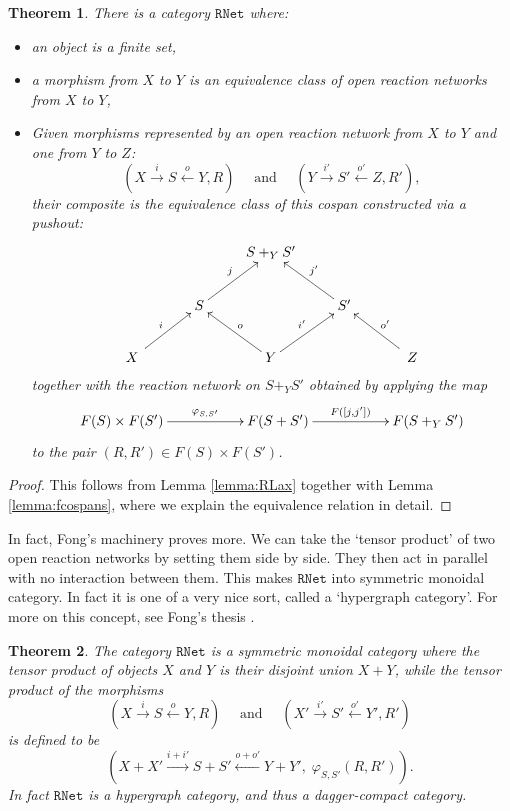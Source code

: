 \documentclass{compositionalityarticle}
\newcommand{\RNet}{\mathtt{RNet}}
\theoremstyle{compositionality}
\newtheorem{thm}{Theorem}
\theoremstyle{remark}
\begin{document}
\begin{thm}
There is a category $\RNet$ where:
\begin{itemize}
\item an object is a finite set,
\item a morphism from $X$ to $Y$ is an equivalence class of open reaction networks 
from $X$ to $Y$, 
\item Given morphisms represented by an open reaction network from $X$ to $Y$ and one from $Y$ to $Z$:
 \[
    (X \stackrel{i}\longrightarrow S \stackrel{o}\longleftarrow Y, R) 
    \quad \textrm{ and } \quad
    (Y \stackrel{i'}\longrightarrow S' \stackrel{o'}\longleftarrow Z, R'), 
  \]
their composite is the equivalence class of this cospan constructed via a pushout:
  \[
    \xymatrix{
      && S +_Y S' \\
      & S \ar[ur]^{j} && S' \ar[ul]_{j'} \\
      \quad X\quad \ar[ur]^{i} && Y \ar[ul]_{o} \ar[ur]^{i'} &&\quad Z \quad \ar[ul]_{o'}
    }
  \]
together with the reaction network on $S +_Y S'$ obtained by applying the map
\[      
\xymatrix{      F(S) \times F(S') \ar[rr]^-{\varphi_{S,S'}} && 
                     F(S + S') \ar[rr]^-{F([j,j'])} && F(S +_Y S') } \]
to the pair $(R,R') \in F(S) \times F(S')$.  
\end{itemize}
\end{thm}

\begin{proof}
This follows from Lemma \ref{lemma:RLax} together with Lemma 
\ref{lemma:fcospans}, where we explain the equivalence relation in detail.  
\end{proof}

In fact, Fong's machinery proves more.  We can take the `tensor product' of  two open reaction networks by setting them side by side.  They then act in parallel with no interaction between them.  This makes $\RNet$ into symmetric monoidal category. 
In fact it is one of a very nice sort, called a `hypergraph category'.  For more on this concept, see Fong's thesis \cite{FongThesis}.

\begin{thm}
The category $\RNet$ is a symmetric monoidal category where the tensor product of objects $X$ and $Y$ is their disjoint union $X + Y$, while the tensor product of the morphisms
\[
    (X \stackrel{i}{\longrightarrow} S \stackrel{o}{\longleftarrow} Y, R) 
    \quad \textrm{ and } \quad
    (X' \stackrel{i'}{\longrightarrow} S' \stackrel{o'}{\longleftarrow} Y', R') 
  \]
is defined to be
\[  ( X + X' \stackrel{i+i'}{\longrightarrow} S + S'  \stackrel{o + o'}{\longleftarrow} Y + Y', \;
\varphi_{S,S'}(R,R') ) .\]
In fact $\RNet$ is a hypergraph category, and thus a dagger-compact category.
\end{thm}
\end{document}

